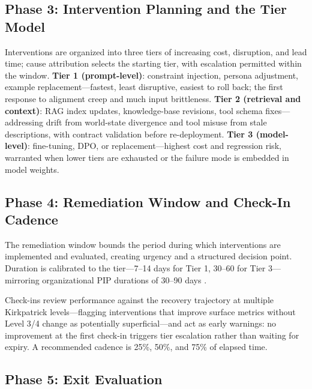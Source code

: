 \documentclass[conference]{IEEEtran}
\begin{document}
\subsection{Phase 3: Intervention Planning and the Tier Model}

Interventions are organized into three tiers of increasing cost, disruption,
and lead time; cause attribution selects the starting tier, with escalation
permitted within the window. \textbf{Tier 1 (prompt-level)}: constraint
injection, persona adjustment, example replacement---fastest, least disruptive,
easiest to roll back; the first response to alignment creep and much input
brittleness. \textbf{Tier 2 (retrieval and context)}: RAG index updates,
knowledge-base revisions, tool schema fixes---addressing drift from world-state
divergence and tool misuse from stale descriptions, with contract validation
before re-deployment. \textbf{Tier 3 (model-level)}: fine-tuning, DPO, or
replacement---highest cost and regression risk, warranted when lower tiers are
exhausted or the failure mode is embedded in model weights.

\subsection{Phase 4: Remediation Window and Check-In Cadence}

The remediation window bounds the period during which interventions are
implemented and evaluated, creating urgency and a structured decision point.
Duration is calibrated to the tier---7--14 days for Tier 1, 30--60 for Tier
3---mirroring organizational PIP durations of 30--90 days \cite{kirkpatrick2016}.

Check-ins review performance against the recovery trajectory at multiple
Kirkpatrick levels---flagging interventions that improve surface metrics
without Level 3/4 change as potentially superficial---and act as early
warnings: no improvement at the first check-in triggers tier escalation rather
than waiting for expiry. A recommended cadence is 25\%, 50\%, and 75\% of
elapsed time.

\subsection{Phase 5: Exit Evaluation}
\label{sec:exit}
\end{document}
